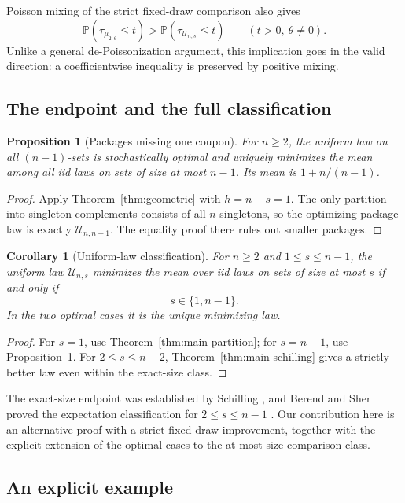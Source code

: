 \documentclass[11pt]{article}
\numberwithin{equation}{section}
\newtheorem{proposition}[theorem]{Proposition}
\newtheorem{corollary}[theorem]{Corollary}
\theoremstyle{remark}
\newcommand{\Pp}{\mathbb P}
\newcommand{\1}{\mathbf 1}
\newcommand{\U}{\mathcal U}
\begin{document}
Poisson mixing of the strict fixed-draw comparison also gives
\[
 \Pp(\tau_{\mu_{2,\theta}}\leq t)>
 \Pp(\tau_{\U_{n,s}}\leq t)\qquad(t>0,\ \theta\ne0).
\]
Unlike a general de-Poissonization argument, this implication goes in the valid direction: a coefficientwise inequality is preserved by positive mixing.

\subsection{The endpoint and the full classification}

\begin{proposition}[Packages missing one coupon]\label{prop:endpoint}
For $n\geq2$, the uniform law on all $(n-1)$-sets is stochastically optimal and uniquely minimizes the mean among all iid laws on sets of size \emph{at most} $n-1$. Its mean is $1+n/(n-1)$.
\end{proposition}

\begin{proof}
Apply Theorem~\ref{thm:geometric} with $h=n-s=1$. The only partition into singleton complements consists of all $n$ singletons, so the optimizing package law is exactly $\U_{n,n-1}$. The equality proof there rules out smaller packages.
\end{proof}

\begin{corollary}[Uniform-law classification]\label{cor:uniform-classification}
For $n\geq2$ and $1\leq s\leq n-1$, the uniform law $\U_{n,s}$ minimizes the mean over iid laws on sets of size at most $s$ if and only if
\[
 s\in\{1,n-1\}.
\]
In the two optimal cases it is the unique minimizing law.
\end{corollary}

\begin{proof}
For $s=1$, use Theorem~\ref{thm:main-partition}; for $s=n-1$, use Proposition~\ref{prop:endpoint}. For $2\leq s\leq n-2$, Theorem~\ref{thm:main-schilling} gives a strictly better law even within the exact-size class.
\end{proof}

The exact-size endpoint was established by Schilling \cite{Schilling}, and Berend and Sher proved the expectation classification for $2\leq s\leq n-1$ \cite{BerendSher}. Our contribution here is an alternative proof with a strict fixed-draw improvement, together with the explicit extension of the optimal cases to the at-most-size comparison class.

\subsection{An explicit example}
\end{document}
